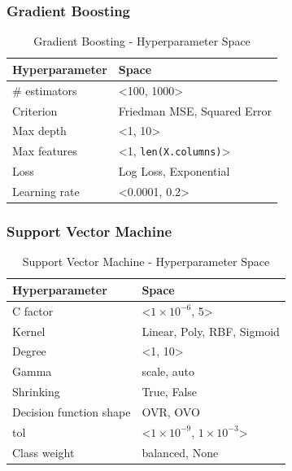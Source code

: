 \subsubsection{Gradient Boosting}

\begin{table}[H]
\small
\setlength{\tabcolsep}{8pt}
\renewcommand{\arraystretch}{1.3}
\centering
    \caption[Gradient Boosting - Hyperparameter Space]{Gradient Boosting - Hyperparameter Space}\label{tab:gbspace}
    \begin{tabular}{ll}
\toprule
\textbf{Hyperparameter} & \textbf{Space}\\
\midrule
\hline
\# estimators & <100, 1000> \\
Criterion & Friedman MSE, Squared Error \\
Max depth & <1, 10> \\
Max features & <1, \verb|len(X.columns)|>  \\
Loss & Log Loss, Exponential \\
Learning rate & <0.0001, 0.2> \\
\hline
\bottomrule
\end{tabular}
\vspace{0.7em}

\vspace{-1em}
\end{table}

\subsubsection{Support Vector Machine}


\begin{table}[H]
\small
\setlength{\tabcolsep}{8pt}
\renewcommand{\arraystretch}{1.3}
\centering
    \caption[Support Vector Machine - Hyperparameter Space]{Support Vector Machine - Hyperparameter Space}\label{tab:svmspace}
    \begin{tabular}{ll}
\toprule
\textbf{Hyperparameter} & \textbf{Space}\\
\midrule
\hline
C factor & <$1\times 10^{-6}$, 5> \\
Kernel & Linear, Poly, RBF, Sigmoid \\
Degree & <1, 10> \\
Gamma & scale, auto \\
Shrinking & True, False \\
Decision function shape & OVR, OVO \\
tol & <$1\times 10^{-9}$, $1\times 10^{-3}$> \\
Class weight & balanced, None \\
\hline
\bottomrule
\end{tabular}
\vspace{0.7em}

\vspace{-1em}
\end{table}

